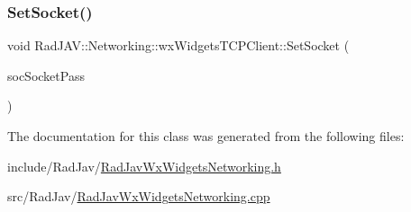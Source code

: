 \subsubsection{\texorpdfstring{Set\+Socket()}{SetSocket()}}
{\footnotesize\ttfamily void Rad\+J\+A\+V\+::\+Networking\+::wx\+Widgets\+T\+C\+P\+Client\+::\+Set\+Socket (\begin{DoxyParamCaption}\item[{wx\+Socket\+Client $\ast$}]{soc\+Socket\+Pass }\end{DoxyParamCaption})}



The documentation for this class was generated from the following files\+:\begin{DoxyCompactItemize}
\item 
include/\+Rad\+Jav/\mbox{\hyperlink{_rad_jav_wx_widgets_networking_8h}{Rad\+Jav\+Wx\+Widgets\+Networking.\+h}}\item 
src/\+Rad\+Jav/\mbox{\hyperlink{_rad_jav_wx_widgets_networking_8cpp}{Rad\+Jav\+Wx\+Widgets\+Networking.\+cpp}}\end{DoxyCompactItemize}
